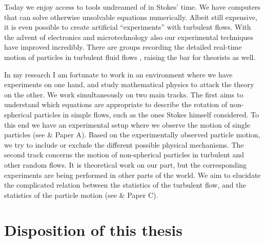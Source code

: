 \documentclass[thesis.tex]{subfiles}
\begin{document}
Today we enjoy access to tools undreamed of in Stokes' time. We have computers that can solve otherwise unsolvable equations numerically. Albeit still expensive, it is even possible to create artificial ``experiments'' with turbulent flows. With the advent of electronics and microtechnology also our experimental techniques have improved incredibly. There are groups recording the detailed real-time motion of particles in turbulent fluid flows \cite{pumir2011,parsa2012}, raising the bar for theorists as well.

In my research I am fortunate to work in an environment where we have experiments on one hand, and study mathematical physics to attack the theory on the other. We work simultaneously on two main tracks. The first aims to understand which equations are appropriate to describe the rotation of non-spherical particles in simple flows, such as the ones Stokes himself considered. To this end we have an experimental setup where we observe the motion of single particles (see  \& Paper A). Based on the experimentally observed particle motion, we try to include or exclude the different possible physical mechanisms. The second track concerns the motion of non-spherical particles in turbulent and other random flows. It is theoretical work on our part, but the corresponding experiments are being performed in other parts of the world. We aim to elucidate the complicated relation between the statistics of the turbulent flow, and the statistics of the particle motion (see  \& Paper C).


\section*{Disposition of this thesis}
\end{document}
